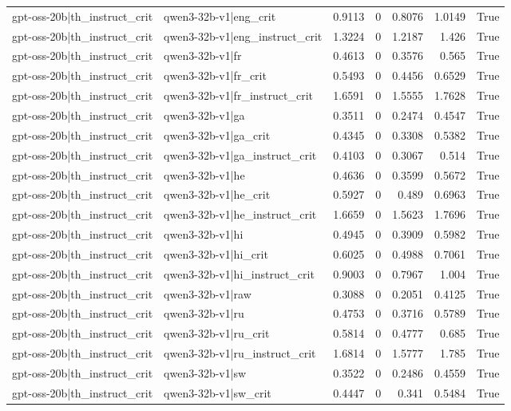 \begin{table}
\begin{tabular}{l l r r r r l}
gpt-oss-20b|th_instruct_crit & qwen3-32b-v1|eng_crit & 0.9113 & 0 & 0.8076 & 1.0149 & True \\
gpt-oss-20b|th_instruct_crit & qwen3-32b-v1|eng_instruct_crit & 1.3224 & 0 & 1.2187 & 1.426 & True \\
gpt-oss-20b|th_instruct_crit & qwen3-32b-v1|fr & 0.4613 & 0 & 0.3576 & 0.565 & True \\
gpt-oss-20b|th_instruct_crit & qwen3-32b-v1|fr_crit & 0.5493 & 0 & 0.4456 & 0.6529 & True \\
gpt-oss-20b|th_instruct_crit & qwen3-32b-v1|fr_instruct_crit & 1.6591 & 0 & 1.5555 & 1.7628 & True \\
gpt-oss-20b|th_instruct_crit & qwen3-32b-v1|ga & 0.3511 & 0 & 0.2474 & 0.4547 & True \\
gpt-oss-20b|th_instruct_crit & qwen3-32b-v1|ga_crit & 0.4345 & 0 & 0.3308 & 0.5382 & True \\
gpt-oss-20b|th_instruct_crit & qwen3-32b-v1|ga_instruct_crit & 0.4103 & 0 & 0.3067 & 0.514 & True \\
gpt-oss-20b|th_instruct_crit & qwen3-32b-v1|he & 0.4636 & 0 & 0.3599 & 0.5672 & True \\
gpt-oss-20b|th_instruct_crit & qwen3-32b-v1|he_crit & 0.5927 & 0 & 0.489 & 0.6963 & True \\
gpt-oss-20b|th_instruct_crit & qwen3-32b-v1|he_instruct_crit & 1.6659 & 0 & 1.5623 & 1.7696 & True \\
gpt-oss-20b|th_instruct_crit & qwen3-32b-v1|hi & 0.4945 & 0 & 0.3909 & 0.5982 & True \\
gpt-oss-20b|th_instruct_crit & qwen3-32b-v1|hi_crit & 0.6025 & 0 & 0.4988 & 0.7061 & True \\
gpt-oss-20b|th_instruct_crit & qwen3-32b-v1|hi_instruct_crit & 0.9003 & 0 & 0.7967 & 1.004 & True \\
gpt-oss-20b|th_instruct_crit & qwen3-32b-v1|raw & 0.3088 & 0 & 0.2051 & 0.4125 & True \\
gpt-oss-20b|th_instruct_crit & qwen3-32b-v1|ru & 0.4753 & 0 & 0.3716 & 0.5789 & True \\
gpt-oss-20b|th_instruct_crit & qwen3-32b-v1|ru_crit & 0.5814 & 0 & 0.4777 & 0.685 & True \\
gpt-oss-20b|th_instruct_crit & qwen3-32b-v1|ru_instruct_crit & 1.6814 & 0 & 1.5777 & 1.785 & True \\
gpt-oss-20b|th_instruct_crit & qwen3-32b-v1|sw & 0.3522 & 0 & 0.2486 & 0.4559 & True \\
gpt-oss-20b|th_instruct_crit & qwen3-32b-v1|sw_crit & 0.4447 & 0 & 0.341 & 0.5484 & True \\

\end{tabular}
\end{table}
